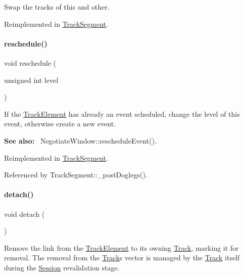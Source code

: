 Swap the tracks of {\ttfamily this} and {\ttfamily other}. 

Reimplemented in \mbox{\hyperlink{classKite_1_1TrackSegment_acc245ce084989d1c34816d0e61b9d510}{Track\+Segment}}.

\mbox{\label{classKite_1_1TrackElement_a0ffe603ec7d46f21f5e56ccbe84c03fb}} 
\paragraph{\texorpdfstring{reschedule()}{reschedule()}}
{\footnotesize\ttfamily void reschedule (\begin{DoxyParamCaption}\item[{unsigned int}]{level }\end{DoxyParamCaption})\hspace{0.3cm}{\ttfamily [virtual]}}

If the \mbox{\hyperlink{classKite_1_1TrackElement}{Track\+Element}} has already an event scheduled, change the level of this event, otherwise create a new event.

{\bfseries See also\+:}~ Negotiate\+Window\+::reschedule\+Event(). 

Reimplemented in \mbox{\hyperlink{classKite_1_1TrackSegment_a0ffe603ec7d46f21f5e56ccbe84c03fb}{Track\+Segment}}.



Referenced by Track\+Segment\+::\+\_\+post\+Doglegs().

\mbox{\label{classKite_1_1TrackElement_ac295bade8aee589f6718dfa79edc2a34}} 
\paragraph{\texorpdfstring{detach()}{detach()}}
{\footnotesize\ttfamily void detach (\begin{DoxyParamCaption}{ }\end{DoxyParamCaption})\hspace{0.3cm}{\ttfamily [virtual]}}

Remove the link from the \mbox{\hyperlink{classKite_1_1TrackElement}{Track\+Element}} to it\textquotesingle{}s owning \mbox{\hyperlink{classKite_1_1Track}{Track}}, marking it for removal. The removal from the \mbox{\hyperlink{classKite_1_1Track}{Track}}\textquotesingle{}s vector is managed by the \mbox{\hyperlink{classKite_1_1Track}{Track}} itself during the \mbox{\hyperlink{classKite_1_1Session}{Session}} revalidation stage. 

